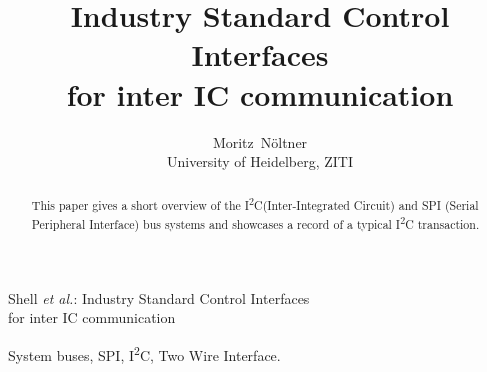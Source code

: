 \documentclass[journal]{IEEEtran}
\newcommand{\twi}{I\textsuperscript{2}C\xspace}
\begin{document}
\title{Industry Standard Control Interfaces\\for inter IC communication}
%
%
%


\author{Moritz~N\"oltner\\%
		University of Heidelberg, ZITI}

%
{Shell \MakeLowercase{\textit{et al.}}: Industry Standard Control Interfaces\\for inter IC communication}


\maketitle

\begin{abstract}
This paper gives a short overview of the \twi (Inter-Integrated Circuit) and SPI (Serial Peripheral Interface) bus systems and showcases a record of a typical \twi transaction.
\end{abstract}

\begin{IEEEkeywords}
System buses, SPI, \twi, Two Wire Interface.
\end{IEEEkeywords}
\end{document}
